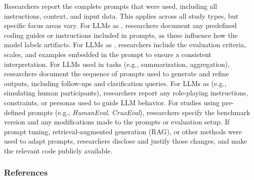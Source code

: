 Researchers \must report the complete prompts that were used, including all instructions, context, and input data. This applies across all study types, but specific focus areas vary.
For LLMs as \annotators, researchers \must document any predefined coding guides or instructions included in prompts, as these influence how the model labels artifacts.
For LLMs as \judges, researchers \must include the evaluation criteria, scales, and examples embedded in the prompt to ensure a consistent interpretation.
For LLMs used in \synthesis tasks (e.g., summarization, aggregation), researchers \must document the sequence of prompts used to generate and refine outputs, including follow-ups and clarification queries.
For LLMs as \subjects (e.g., simulating human participants), researchers \must report any role-playing instructions, constraints, or personas used to guide LLM behavior.
For \benchmarkingtasks studies using pre-defined prompts (e.g., \emph{HumanEval}, \emph{CruxEval}), researchers \must specify the benchmark version and any modifications made to the prompts or evaluation setup.
If prompt tuning, retrieval-augmented generation (RAG), or other methods were used to adapt prompts, researchers \must disclose and justify those changes, and \should make the relevant code publicly available.

\subsubsection{References}





